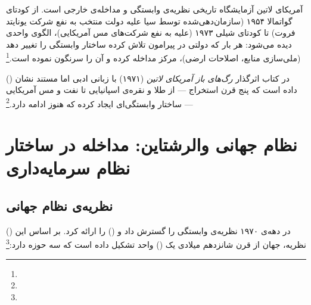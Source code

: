 \begin{tcolorbox}[casebox, title={مطالعه‌ی موردی: وابستگی و مداخله در آمریکای لاتین}]
آمریکای لاتین آزمایشگاه تاریخی نظریه‌ی وابستگی و مداخله‌ی خارجی است. از کودتای گواتمالا ۱۹۵۴ (سازمان‌دهی‌شده توسط سیا علیه دولت منتخب  به نفع شرکت یونایتد فروت) تا کودتای شیلی ۱۹۷۳ (علیه  به نفع شرکت‌های مس آمریکایی)، الگوی واحدی دیده می‌شود: هر بار که دولتی در پیرامون تلاش کرده ساختار وابستگی را تغییر دهد (ملی‌سازی منابع، اصلاحات ارضی)، مرکز مداخله کرده و آن را سرنگون نموده است.\footnote{}

 () در کتاب اثرگذار \textit{رگ‌های باز آمریکای لاتین} (۱۹۷۱) با زبانی ادبی اما مستند نشان داده است که پنج قرن استخراج — از طلا و نقره‌ی اسپانیایی تا نفت و مس آمریکایی — ساختار وابستگی‌ای ایجاد کرده که هنوز ادامه دارد.\footnote{}
\end{tcolorbox}


\section{نظام جهانی والرشتاین: مداخله در ساختار نظام سرمایه‌داری}
\label{sec:ch12-wallerstein}

\subsection{نظریه‌ی نظام جهانی}
\label{subsec:ch12-world-system}

 () در دهه‌ی ۱۹۷۰ نظریه‌ی وابستگی را گسترش داد و  () را ارائه کرد. بر اساس این نظریه، جهان از قرن شانزدهم میلادی یک  () واحد تشکیل داده است که سه حوزه دارد:\footnote{}

